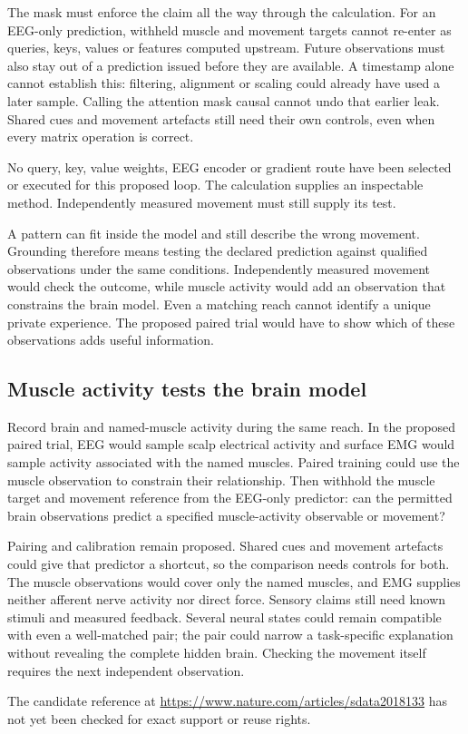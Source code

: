 The mask must enforce the claim all the way through the calculation. For an
EEG-only prediction, withheld muscle and movement targets cannot re-enter as
queries, keys, values or features computed upstream. Future observations must
also stay out of a prediction issued before they are available. A timestamp
alone cannot establish this: filtering, alignment or scaling could already
have used a later sample. Calling the attention mask causal cannot undo that
earlier leak. Shared cues and movement artefacts still need their own controls,
even when every matrix operation is correct.

No query, key, value weights, EEG encoder or gradient route have been selected
or executed for this proposed loop. The calculation supplies an inspectable
method. Independently measured movement must still supply its test.

A pattern can fit inside the model and still describe the wrong movement.
Grounding therefore means testing the declared prediction against qualified
observations under the same conditions. Independently measured movement would
check the outcome, while muscle activity would add an observation that
constrains the brain model. Even a matching reach cannot identify a unique
private experience. The proposed paired trial would have to show which of
these observations adds useful information.

\subsection{Muscle activity tests the brain model}
Record brain and named-muscle activity during the same reach. In the proposed
paired trial, EEG would sample scalp electrical activity and surface EMG would
sample activity associated with the named muscles. Paired training could use
the muscle observation to constrain their relationship. Then withhold the
muscle target and movement reference from the EEG-only predictor: can the
permitted brain observations predict a specified muscle-activity observable
or movement?

Pairing and calibration remain proposed. Shared cues and movement artefacts
could give that predictor a shortcut, so the comparison needs controls for
both. The muscle observations would cover only the named muscles, and EMG
supplies neither afferent nerve activity nor direct force. Sensory claims
still need known stimuli and measured feedback. Several neural states could
remain compatible with even a well-matched pair; the pair could narrow a
task-specific explanation without revealing the complete hidden brain.
Checking the movement itself requires the next independent observation.
\par\noindent The candidate reference at \url{https://www.nature.com/articles/sdata2018133} has not yet been checked for exact support or reuse rights.

